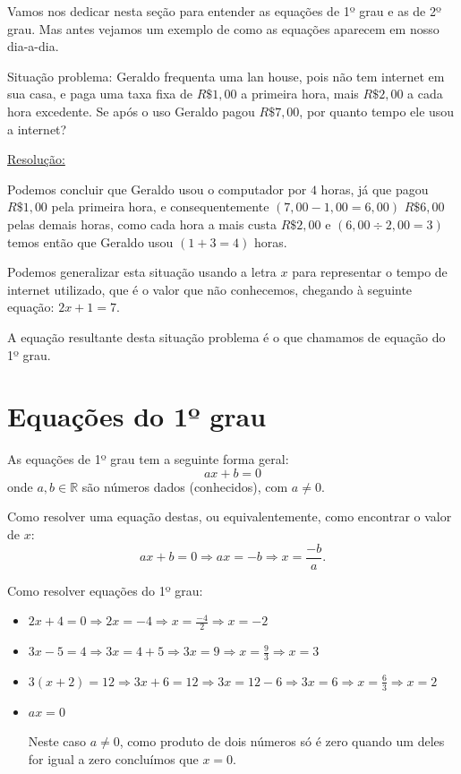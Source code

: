 Vamos nos dedicar nesta seção para entender as equações de 1º grau e as de 2º grau. Mas antes vejamos um exemplo de como as equações aparecem em nosso dia-a-dia.

\begin{exem}
 Situação problema: Geraldo frequenta uma lan house, pois não tem internet em sua casa, e paga uma taxa fixa de $R\$ 1,00$ a primeira hora, mais $R\$ 2,00$ a cada hora excedente. Se após o uso Geraldo pagou $R\$ 7,00$, por quanto tempo ele usou a internet?

 \underline{Resolução:}

 Podemos concluir que Geraldo usou o computador por $4$ horas, já que pagou $R\$ 1,00$ pela primeira hora, e consequentemente $(7,00 - 1,00 = 6,00)$ $R\$ 6,00$ pelas demais horas, como cada hora a mais custa $R\$ 2,00$ e $(6,00 \div 2,00 = 3)$ temos então que Geraldo usou $(1 + 3 = 4)$ horas.

 Podemos generalizar esta situação usando a letra $x$ para representar o tempo de internet utilizado, que é o valor que não conhecemos, chegando à seguinte equação: $2x + 1 = 7$.
\end{exem}

A equação resultante desta situação problema é o que chamamos de equação do 1º grau.

\section{Equações do 1º grau}

\colorbox{azul}{
 \begin{minipage}{0.9\linewidth}
 \begin{center}
   As equações de 1º grau tem a seguinte forma geral:
 \[ax + b = 0\]
onde $a, b \in \mathbb{R}$ são números dados (conhecidos), com $a \neq 0 $.
 \end{center}
 \end{minipage}}

 \vskip0.3cm

Como resolver uma equação destas, ou equivalentemente, como encontrar o valor de $x$:
\[ax + b = 0 \Rightarrow ax= -b \Rightarrow x = \frac{-b}{a} .\]


\begin{exem}
 Como resolver equações do 1º grau:
 \begin{itemize}
  \item $2x + 4 = 0 \Rightarrow 2x = -4 \Rightarrow x = \frac{-4}{2} \Rightarrow x = -2$
  \item $3x - 5 = 4 \Rightarrow 3x = 4 +5 \Rightarrow 3x = 9 \Rightarrow x = \frac{9}{3} \Rightarrow x = 3$
  \item $3(x + 2)= 12 \Rightarrow 3x + 6 = 12 \Rightarrow 3x = 12 - 6 \Rightarrow 3x = 6 \Rightarrow x = \frac{6}{3} \Rightarrow x = 2 $
  \item $ax = 0$

  Neste caso $a \neq 0$, como produto de dois números só é zero quando um deles for igual a zero concluímos que $x = 0$.
  \end{itemize}
\end{exem}

